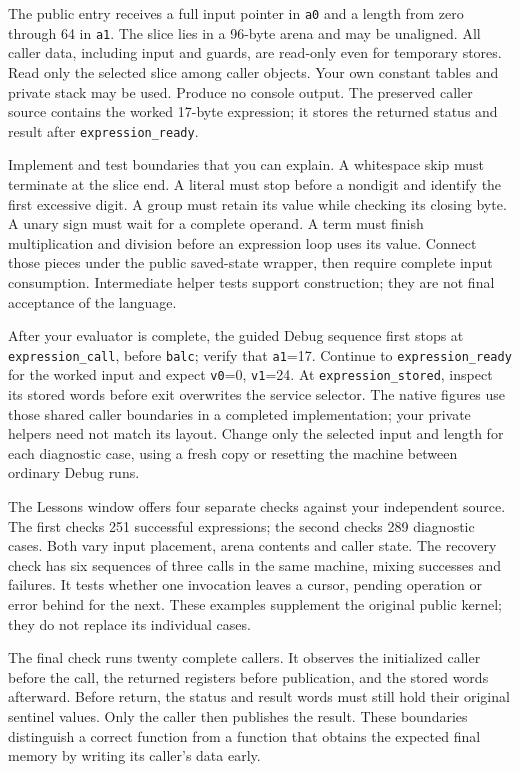 The public entry receives a full input pointer in \texttt{a0} and a length from
zero through 64 in \texttt{a1}. The slice lies in a 96-byte arena and may be
unaligned. All caller data, including input and guards, are read-only even for
temporary stores. Read only the selected slice among caller objects. Your own
constant tables and private stack may be used. Produce no console output.
The preserved caller source contains the worked 17-byte expression; it stores
the returned status and result after \texttt{expression\_ready}.

Implement and test boundaries that you can explain. A whitespace skip must
terminate at the slice end. A literal must stop before a nondigit and identify
the first excessive digit. A group must retain its value while checking its
closing byte. A unary sign must wait for a complete operand. A term must finish
multiplication and division before an expression loop uses its value. Connect
those pieces under the public saved-state wrapper, then require complete input
consumption. Intermediate helper tests support construction; they are not final
acceptance of the language.

After your evaluator is complete, the guided Debug sequence first stops at
\texttt{expression\_call}, before \texttt{balc}; verify that \texttt{a1}=17.
Continue to \texttt{expression\_ready} for the worked input and expect \texttt{v0}=0, \texttt{v1}=24. At
\texttt{expression\_stored}, inspect its stored words before exit overwrites the
service selector. The native figures use those shared caller boundaries in a
completed implementation; your private helpers need not match its layout.
Change only the selected input and length for each diagnostic case, using a
fresh copy or resetting the machine between ordinary Debug runs.

The Lessons window offers four separate checks against your independent source.
The first checks 251 successful expressions; the second checks 289 diagnostic
cases. Both vary input placement, arena contents and caller state. The recovery
check has six sequences of three calls in the same machine, mixing successes
and failures. It tests whether one invocation leaves a cursor, pending operation
or error behind for the next. These examples supplement the original public
kernel; they do not replace its individual cases.

The final check runs twenty complete callers. It observes the initialized
caller before the call, the returned registers before publication, and the
stored words afterward. Before return, the status and result words must still
hold their original sentinel values. Only the caller then publishes the result.
These boundaries distinguish a correct function from a function that obtains
the expected final memory by writing its caller's data early.

